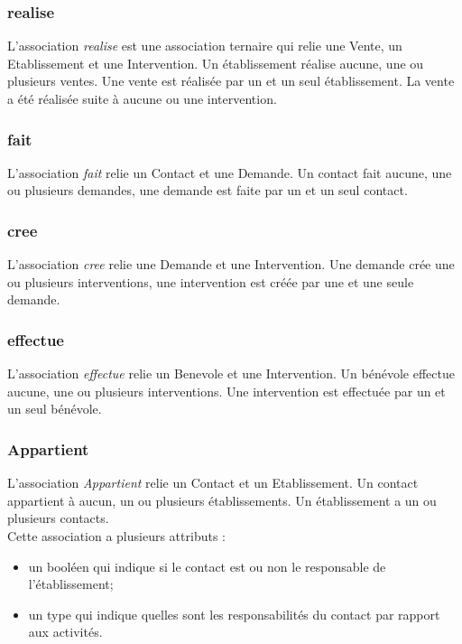 \subsubsection*{realise}

L'association \textit{realise} est une association ternaire qui relie une Vente, un Etablissement et une Intervention. Un établissement réalise aucune, une ou plusieurs ventes. Une vente est réalisée par un et un seul établissement. La vente a été réalisée suite à aucune ou une intervention.

\subsubsection*{fait}

L'association \textit{fait} relie un Contact et une Demande. Un contact fait aucune, une ou plusieurs demandes, une demande est faite par un et un seul contact.

\subsubsection*{cree}

L'association \textit{cree} relie une Demande et une Intervention. Une demande crée une ou plusieurs interventions, une intervention est créée par une et une seule demande.

\subsubsection*{effectue} 

L'association \textit{effectue} relie un Benevole et une Intervention. Un bénévole effectue aucune, une ou plusieurs interventions. Une intervention est effectuée par un et un seul bénévole. 

\subsubsection*{Appartient}

L'association \textit{Appartient} relie un Contact et un Etablissement. Un contact appartient à aucun, un ou plusieurs établissements. Un établissement a un ou plusieurs contacts.\\
Cette association a plusieurs attributs :
\begin{itemize}
\item un booléen qui indique si le contact est ou non le responsable de l'établissement; 
\item un type qui indique quelles sont les responsabilités du contact par rapport aux activités.
\end{itemize}


